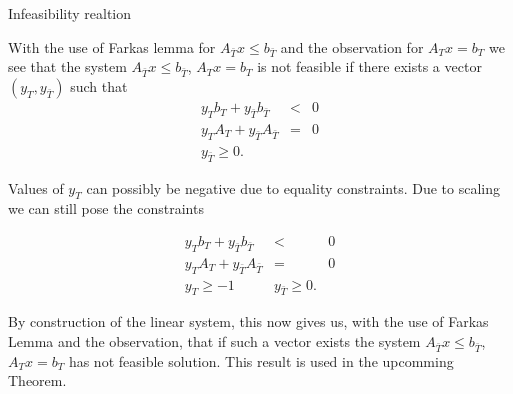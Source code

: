 \documentclass{beamer}
\begin{document}

\begin{frame}

	\begin{block}{Infeasibility realtion}

		With the use of Farkas lemma for $A_{\bar{T}} x \leq b_{\bar{T}}$ and the observation for $A_T x = b_T$ we see that the system $A_{\bar{T}} x \leq b_{\bar{T}}$, $A_T x = b_T$ is not feasible if there exists a vector $(y_T, y_{\bar{T}})$ such that\\

		\begin{eqnarray*}
			y_T b_T + y_{\bar{T}} b_{\bar{T}} & < & 0 \\
			y_T A_T + y_{\bar{T}} A_{\bar{T}} & = & 0 \\
			y_{\bar{T}} \geq 0.
		\end{eqnarray*}

	\end{block}

\end{frame}

\begin{frame}

	\begin{block}

		Values of $y_T$ can possibly be negative due to equality constraints. Due to scaling we can still pose the constraints

		\begin{eqnarray*}
			y_T b_T + y_{\bar{T}} b_{\bar{T}} & < & 0 \\
			y_T A_T + y_{\bar{T}} A_{\bar{T}} & = & 0 \\
			y_T \geq -1 & y_{\bar{T}} \geq 0.
		\end{eqnarray*}

		By construction of the linear system, this now gives us, with the use of Farkas Lemma and the observation, that if such a vector exists the system $A_{\bar{T}} x \leq b_{\bar{T}}$, $A_T x = b_T$ has not feasible solution. This result is used in the upcomming Theorem.

	\end{block}

\end{frame}

\end{document}
